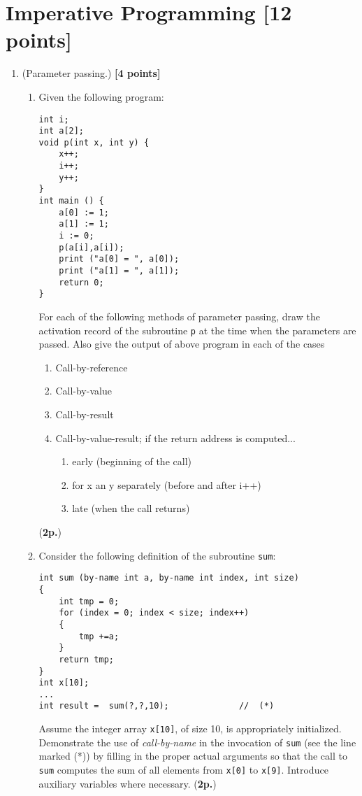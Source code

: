 \documentclass{article}
\begin{document}
\section{Imperative Programming [12 points]}

\begin{enumerate}
\item (Parameter passing.) 
\hfill{\textbf{[4 points]}}
\begin{enumerate}
\item Given  the following program:

{\small
\begin{verbatim}
int i;
int a[2];
void p(int x, int y) {
    x++;
    i++;
    y++;
}
int main () {
    a[0] := 1;
    a[1] := 1;
    i := 0;
    p(a[i],a[i]);
    print ("a[0] = ", a[0]);
    print ("a[1] = ", a[1]);
    return 0;
}
\end{verbatim}
}

For each of the following methods of parameter passing,
draw the activation record of the subroutine \texttt{p} at the time when
the parameters are passed. Also give the output of above program
in each of the cases

\begin{enumerate}\itemsep=0.0cm
\item Call-by-reference
\item Call-by-value
\item Call-by-result
\item Call-by-value-result; if the return address is computed...
\begin{enumerate}\itemsep=0.0cm
\item early (beginning of the call)
\item for x an y separately (before and after i++)
\item late (when the call returns)
\end{enumerate}
\end{enumerate}
 (\textbf{2p.})
\item Consider the following definition of the 
subroutine \texttt{sum}: 

{\small 
\begin{verbatim}
int sum (by-name int a, by-name int index, int size)
{
    int tmp = 0;
    for (index = 0; index < size; index++)
    {
        tmp +=a;
    }
    return tmp;
}
int x[10];
...
int result =  sum(?,?,10);              //  (*)   
\end{verbatim}
}
 Assume the integer array \texttt{x[10]}, of size 10, is appropriately
initialized. Demonstrate the use of \textit{call-by-name} in the invocation of
\texttt{sum} (see the line marked (*)) by filling in the
proper actual arguments so that the call to \texttt{sum} computes
the sum of all elements from \texttt{x[0]} to \texttt{x[9]}. 
Introduce auxiliary variables where necessary. (\textbf{2p.})
\\
\end{enumerate} 


\end{enumerate}
\end{document}
